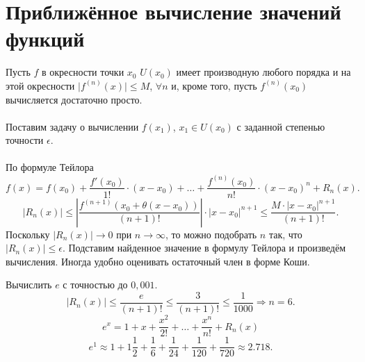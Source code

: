 	\section{Приближённое вычисление значений функций} %
	Пусть $f$  в окресности точки $x_0$ $U(x_0)$ имеет производную любого порядка и на этой окресности $\mid f ^{(n)} (x) \mid \le M$, $\forall n$ и, кроме того, пусть $f ^{(n)} (x_0)$ вычисляется достаточно просто.\\\\
	Поставим задачу о вычислении $f(x_1)$, $x_1 \in U(x_0)$ с заданной степенью точности $\epsilon$.\\\\ По формуле Тейлора
	$$f(x) = f(x_0) + \frac{f\prime(x_0)}{1!} \cdot (x - x_0) + \dots + \frac{f^{(n)}(x_0)}{n!} \cdot (x - x_0)^n + R_n(x).$$
	$$\left| R_n(x) \right| \leq \left| \frac{ f^{(n + 1)}(x_0 + \theta(x - x_0)) }{(n+1)!}\right| \cdot {\left| x - x_0 \right|} ^{n + 1} \le \frac{M \cdot {\left| x - x_0 \right|} ^{n + 1}}{(n+1)!}.$$
	Поскольку $\left| R_n(x) \right| \rightarrow 0$  при $n \rightarrow \infty$, то можно подобрать $n$ так, что $\left| R_n(x) \right| \le \epsilon$. Подставим найденное значение в формулу Тейлора и произведём вычисления. Иногда удобно оценивать остаточный член в форме Коши.\\
	\begin{example} 
		Вычислить $e$  с точностью до $0,001$.\\
		$$\left| R_n(x) \right| \le \frac{e}{(n + 1)!} \le \frac{3}{(n + 1)!} \le \frac{1}{1000} \Rightarrow n = 6.$$
		$$e^x =1 + x + \frac{x^2}{2!} + \dots + \frac{x^n}{n!} + R_n(x)$$
		$$e^1 \approx 1 + 1 \frac{1}{2} + \frac{1}{6} + \frac{1}{24} + \frac{1}{120} + \frac{1}{720} \approx 2.718.$$
	\end{example}
